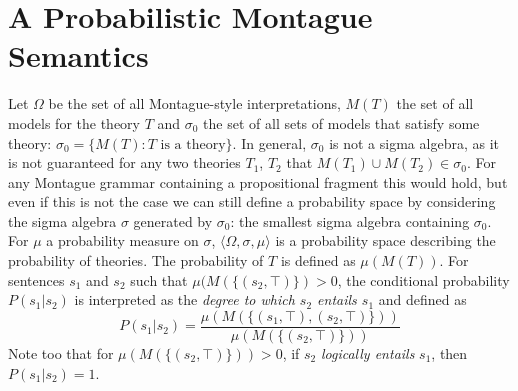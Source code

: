 \documentclass[manuscript]{clv2}
\begin{document}



\section{A Probabilistic Montague Semantics}

Let $\Omega$ be the set of all Montague-style interpretations,  $M(T)$ the set of all models for the theory $T$ and
$\sigma_0$ the set of all sets of models that satisfy some theory: $\sigma_0 = \{M(T) : T\text{ is a theory}\}$.
In general, $\sigma_0$ is not a sigma algebra, as it is not
guaranteed for any two theories $T_1$, $T_2$ that
$M(T_1)\cup M(T_2) \in \sigma_0$. For any Montague grammar containing a propositional
fragment  this would hold, but even if this is not the case we
can still define a probability space by considering the sigma algebra
$\sigma$ generated by $\sigma_0$: the smallest
sigma algebra containing $\sigma_0$. For $\mu$ a probability measure on $\sigma$, 
$\langle\Omega,\sigma,\mu\rangle$ is a probability space
describing the probability of theories. The probability of $T$ is defined as
$\mu(M(T))$. For  sentences $s_1$ and $s_2$ such that $\mu(M(\{(s_2,\top)\}) >0$, the conditional
probability $P(s_1 | s_2 )$  is interpreted as the {\em degree to which $s_2$ entails $s_1$\/} and defined as
$$ P(s_1|s_2) = \frac{\mu(M(\{(s_1, \top), (s_2, \top)\}))}{\mu(M(\{(s_2,\top)\}))}$$
Note too that for $\mu(M(\{(s_2,\top)\})) > 0$, if $s_2$ {\em logically entails\/} $s_1$, then
$P(s_1|s_2) = 1$.



\end{document}
